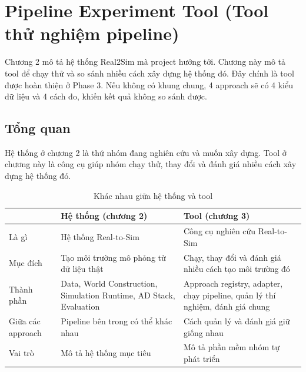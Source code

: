 \chapter{Pipeline Experiment Tool (Tool thử nghiệm pipeline)}

Chương 2 mô tả hệ thống Real2Sim mà project hướng tới.
Chương này mô tả tool để chạy thử và so sánh nhiều cách xây dựng hệ thống đó.
Đây chính là tool được hoàn thiện ở Phase 3.
Nếu không có khung chung, 4 approach sẽ có 4 kiểu dữ liệu và 4 cách đo, khiến kết quả không so sánh được.

\section{Tổng quan}

Hệ thống ở chương 2 là thứ nhóm đang nghiên cứu và muốn xây dựng.
Tool ở chương này là công cụ giúp nhóm chạy thử, thay đổi và đánh giá nhiều cách xây dựng hệ thống đó.

\begin{table}[H]
  \centering
  \caption{Khác nhau giữa hệ thống và tool}
  \begin{tabularx}{\linewidth}{>{\raggedright\arraybackslash}p{2.9cm} X X}
    \toprule
     & \textbf{Hệ thống (chương 2)} & \textbf{Tool (chương 3)} \\
    \midrule
    Là gì & Hệ thống Real-to-Sim & Công cụ nghiên cứu Real-to-Sim \\
    \addlinespace
    Mục đích & Tạo môi trường mô phỏng từ dữ liệu thật & Chạy, thay đổi và đánh giá nhiều cách tạo môi trường đó \\
    \addlinespace
    Thành phần & Data, World Construction, Simulation Runtime, AD Stack, Evaluation & Approach registry, adapter, chạy pipeline, quản lý thí nghiệm, đánh giá chung \\
    \addlinespace
    Giữa các approach & Pipeline bên trong có thể khác nhau & Cách quản lý và đánh giá giữ giống nhau \\
    \addlinespace
    Vai trò & Mô tả hệ thống mục tiêu & Mô tả phần mềm nhóm tự phát triển \\
    \bottomrule
  \end{tabularx}
\end{table}

